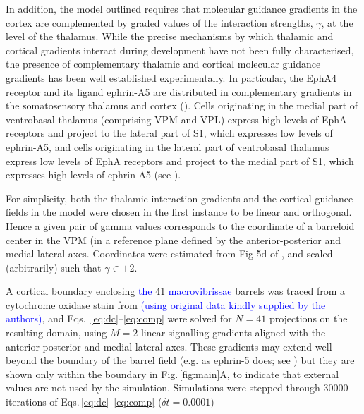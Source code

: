 \documentclass[9pt,lineno]{elife}
\newcommand{\cmnt}[1]{\textcolor{blue}{#1}}
\newcommand{\mpfour}[1]{\textcolor{revgreen}{#1}}
\newcommand{\MPone}[1]{\textcolor{revpink}{#1}}
\begin{document}
\MPone{In addition, the model outlined requires that molecular
  guidance gradients in the cortex are complemented by graded values of the
  interaction strengths, $\gamma$, at the level of the thalamus. While the
  precise mechanisms by which thalamic and cortical gradients interact during
  development have not been fully characterised, the presence of complementary
  thalamic and cortical molecular guidance gradients has been well established
  experimentally. In particular, the EphA4 receptor and its ligand ephrin-A5
  are distributed in complementary gradients in the somatosensory thalamus and
  cortex} (\citealp{vanderhaeghen_mapping_2000,miller_epha7-ephrin-a5_2006}).
\MPone{Cells originating in the medial part of ventrobasal thalamus
  (comprising VPM and VPL) express high levels of EphA receptors and project
  to the lateral part of S1, which expresses low levels of ephrin-A5, and
  cells originating in the lateral part of ventrobasal thalamus express low
  levels of EphA receptors and project to the medial part of S1, which
  expresses high levels of ephrin-A5} (see
\citealp{gao_regulation_1998,dufour_area_2003,vanderhaeghen_developmental_2004,speer_grading_2005,torii_role_2013}).

\MPone{For simplicity, both the thalamic interaction gradients and the
  cortical guidance fields in the model were chosen in the first instance to
  be linear and orthogonal. Hence a given pair of gamma values corresponds to
  the coordinate of a barreloid center in the VPM (in a reference plane
  defined by the anterior-posterior and medial-lateral axes. Coordinates were
  estimated from Fig 5d of} \citep{haidarliu_size_2001}, \MPone{and
  scaled (arbitrarily) such that $\gamma\in\pm 2$.}

A cortical boundary enclosing \cmnt{the} 41 \cmnt{macrovibrissae} barrels was
traced from a cytochrome oxidase stain from \cite{zheng_signal_2001}
\cmnt{(using original data kindly supplied by the authors)}, and
Eqs.~\ref{eq:dc}--\ref{eq:comp} were solved for $N=41$ projections on the
resulting domain, using $M=2$ linear signalling gradients aligned with the
anterior-posterior and medial-lateral axes.  \mpfour{These gradients may
  extend well beyond the boundary of the barrel field (e.g. as ephrin-5 does;
  see \citealp{miller_epha7-ephrin-a5_2006}) but they are shown only within
  the boundary in Fig.\,\ref{fig:main}A, to indicate that external values are
  not used by the simulation. Simulations were stepped through 30000
  iterations of Eqs.\,\ref{eq:dc}--\ref{eq:comp} ($\delta t=0.0001$)}
\end{document}
